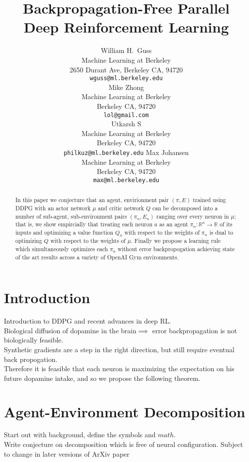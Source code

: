 \documentclass{article} %
\title{Backpropagation-Free Parallel Deep Reinforcement Learning}
\author{
William H.~Guss \\
Machine Learning at Berkeley\\
2650 Durant Ave, Berkeley CA, 94720 \\
\texttt{wguss@ml.berkeley.edu} \\
\And
Mike Zhong \\
Machine Learning at Berkeley \\
Berkeley CA, 94720 \\
\texttt{lol@gmail.com} \\
\And
Utkarsh S \\
Machine Learning at Berkeley \\
Berkeley CA, 94720 \\
\texttt{philkuz@ml.berkeley.edu}
\And
Max Johansen \\
Machine Learning at Berkeley \\
Berkeley CA, 94720 \\
\texttt{max@ml.berkeley.edu}
}
\numberwithin{equation}{subsection}
\numberwithin{theorem}{subsection}
\begin{document}
\maketitle

\begin{abstract}
	In this paper we conjecture that an agent, envirionment pair $(\pi, E)$ trained using DDPG with an actor network $\mu$ and critic network $Q$ can be decomposed
	into a number of sub-agent, sub-environment pairs  $(\pi_n, E_n)$ ranging over every neuron in $\mu$; that is, we show empircially that treating each neuron  $a$ as an agent $\pi_n: \mathbb{R}^n \to \mathbb{R}$ of its inputs and optimizing a value function $Q_n$ with respect to the weights of $\pi_n$ is dual to optimizing $Q$ with respect to the weights of $\mu$. Finally we propose a learning rule which simultaneously optimizes each $\pi_n$ without error backpropogation achieving state of the art results across a variety of OpenAI Gym environments.
\end{abstract}

\section{Introduction}
Introduction to DDPG and recent advances in deep RL. \\[2cm]

Biological diffusion of dopamine in the brain$\implies$ error backpropagation is not biologically feasible. \\[2cm]

Synthetic gradients are a step in the right direction, but still require eventual back propogation. \\[2cm]

Therefore it is feasible that each neuron is maximizing the expectation on his future dopamine intake, and so we propose the following theorem.  \\[2cm]

\section{Agent-Environment Decomposition}

Start out with background, define the symbols and $math$. \\[2cm]

Write conjecture on decomposition which is free of neural configuration. Subject to change in later versions of ArXiv paper \\[2cm] 
\end{document}
